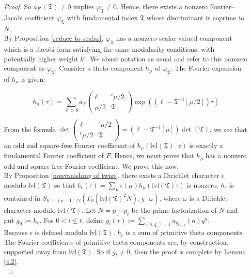 \documentclass[11pt]{article}
\theoremstyle{definition}
\theoremstyle{remark}
\begin{document}
\begin{proof}
So $a_{F^\circ}(\mathfrak{T}) \neq 0$ implies $\varphi_\mathfrak{T} \neq 0$. Hence, there exists a nonzero Fourier--Jacobi coefficient $\varphi_{\mathfrak{T}}$ with fundamental index $\mathfrak{T}$ whose discriminant is coprime to $N$.  \\

By Proposition \ref{reduce to scalar}, $\varphi_\mathfrak{T}$ has a nonzero scalar-valued component which is a Jacobi form satisfying the same modularity conditions, with potentially higher weight $k'$. We abuse notation as usual and refer to this nonzero component as $\varphi_\mathfrak{T}$. Consider a theta component $h_\mu$ of $\varphi_\mathfrak{T}$. The Fourier expansion of $h_\mu$ is given:

\[
h_\mu(\tau) = \sum_{\ell > 0} a_F \begin{pmatrix}
    \ell & ^t\mu/2 \\ \mu/2 & \mathfrak{T} 
\end{pmatrix} \exp((\ell - \mathfrak{T}^{-1}[\mu/2])\tau)
\]

From the formula $\det \begin{pmatrix}
    \ell & ^t\mu/2 \\ ^t\mu/2 & \mathfrak{T} 
\end{pmatrix} = (\ell - \mathfrak{T}^{-1}[\mu])\det(\mathfrak{T})$, we see that an odd and square-free Fourier coefficient of $h_\mu(\mathrm{lvl}(\mathfrak{T}) \cdot \tau)$ is exactly a fundamental Fourier coefficient of $F$. Hence, we must prove that $h_\mu$ has a nonzero odd and square-free Fourier coefficient. We prove this now. \\

By Proposition \ref{nonvanishing of twist}, there exists a Dirichlet character $\epsilon$ modulo $\mathrm{lvl}(\mathfrak{T})$ so that $h_\epsilon(\tau) = \sum_\mu \epsilon(\mu) h_\mu(\mathrm{lvl}(\mathfrak{T})\tau)$ is nonzero. $h_\epsilon$ is contained in $S_{k' - (n-1)/2}(\Gamma_0(\mathrm{lvl}(\mathfrak{T})^2N), \chi \cdot \omega)$, where $\omega$ is a Dirichlet character modulo $\mathrm{lvl}(\mathfrak{T})$. Let $N = p_1 \cdots p_t$ be the prime factorization of $N$ and put $g_0 := h_\epsilon$. For $0 < i \leq t$, define $\displaystyle g_{i}(\tau) := \sum_{(n, q_i) = 1} a_{g_{i-1}}(n) q^n$.\\

Because $\epsilon$ is defined modulo $\mathrm{lvl}(\mathfrak{T})$, $h_\epsilon$ is a sum of primitive theta components. The Fourier coefficients of primitive theta components are, by construction, supported away from $\mathrm{lvl}(\mathfrak{T})$. So if $g_t \neq 0$, then the proof is complete by Lemma \ref{4.2}. \\


\end{proof}
\end{document}
